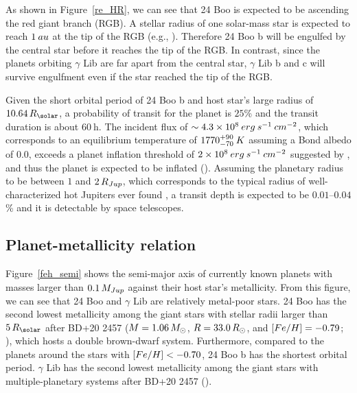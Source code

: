 \documentclass[]{pasj01}
\begin{document}
As shown in Figure~\ref{re_HR}, we can see that 24 Boo is expected to be ascending the red giant branch (RGB).
A stellar radius of one solar-mass star is expected to reach $1\>{\rm au}$ at the tip of the RGB (e.g., \cite{Villaver2009}).
Therefore 24 Boo b will be engulfed by the central star before it reaches the tip of the RGB.
In contrast, since the planets orbiting $\gamma$ Lib are far apart from the central star, $\gamma$ Lib b and c will survive engulfment even if the star reached the tip of the RGB.

Given the short orbital period of 24 Boo b and host star's large radius of $10.64\,R_{\solar}$, a probability of transit for the planet is $25$\% and the transit duration is about $60\>$h.
The incident flux of $\sim4.3\times10^8\>{\rm erg\>s^{-1}\>cm^{-2}}$, which corresponds to an equilibrium temperature of $1770^{+90}_{-70}\>{\rm K}$ assuming a Bond albedo of 0.0, exceeds a planet inflation threshold of $2\times10^8\>{\rm erg\>s^{-1}\>cm^{-2}}$ suggested by \citet{Demory2011}, and thus the planet is expected to be inflated (\cite{Lopez2016}). 
Assuming the planetary radius to be between $1$ and $2\,R_{\rm Jup}$, which corresponds to the typical radius of well-characterized hot Jupiters ever found \citep{Grunblatt2016}, a transit depth is expected to be $0.01$--$0.04$\% and it is detectable by space telescopes.
\subsection{Planet-metallicity relation}
Figure~\ref{feh_semi} shows the semi-major axis of currently known planets with masses larger than $0.1\,M_{\rm Jup}$ against their host star's metallicity.
From this figure, we can see that 24 Boo and $\gamma$ Lib are relatively metal-poor stars.
24 Boo has the second lowest metallicity among the giant stars with stellar radii larger than $5\,R_{\solar}$ after BD+20 2457 ($M=1.06\,M_{\Sol}$, $R=33.0\,R_{\Sol}$, and ${\rm [Fe/H]}=-0.79$; \cite{Mortier2013}), which hosts a double brown-dwarf system.
Furthermore, compared to the planets around the stars with ${\rm [Fe/H]}<-0.70$, 24 Boo b has the shortest orbital period.
$\gamma$ Lib has the second lowest metallicity among the giant stars with multiple-planetary systems after BD+20 2457 (\cite{Niedzielski2009}).
\end{document}
